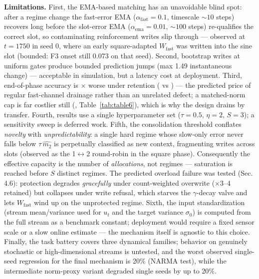 \documentclass[11pt]{article}
\begin{document}
\textbf{Limitations.} First, the EMA-based matching has an unavoidable
blind spot: after a regime change the fast-error EMA
(\(\alpha_{\mathrm{fast}}{=}0.1\), timescale \(\sim 10\) steps) recovers long
before the slot-error EMA (\(\alpha_{\mathrm{ema}}{=}0.01\), \(\sim 100\)
steps) re-qualifies the correct slot, so contaminating reinforcement
writes slip through --- observed at \(t{=}1750\) in seed 0, where an
early square-adapted \(W_{\mathrm{fast}}\) was written into the sine
slot (bounded: F3 onset still 0.073 on that seed). Second, bootstrap
writes at uniform gates produce bounded
prediction jumps (max 1.49 instantaneous change) --- acceptable in
simulation, but a latency cost at deployment. Third, end-of-phase
accuracy is \ctxEndPenalty\(\times\) worse under retention (\ctxEnd{} vs \blockEnd) --- the
predicted price of regular fast-channel drainage rather than an
unrelated defect; a matched-norm cap is far costlier still (\clampEnd,
Table~\ref{tab:table6}), which is why the design drains by transfer. Fourth, results use a single
hyperparameter set (\(\tau{=}0.5\), \(\eta{=}2\), \(S{=}3\)); a sensitivity sweep is
deferred work. Fifth, the consolidation threshold
conflates \emph{novelty} with \emph{unpredictability}: a single hard regime whose
slow-only error never falls below \(\tau\,\widehat{m_2}\) is perpetually
classified as new context, fragmenting writes across slots (observed as
the 1\(\leftrightarrow 2\) round-robin in the square phase). Consequently the effective
capacity is the number of \emph{allocations}, not regimes --- saturation is
reached before \(S\) distinct regimes. The predicted overload failure
was tested (Sec. 4.6): protection degrades \emph{gracefully} under
count-weighted overwrite (×3--4 retained) but collapses under write
refusal, which starves the \(\gamma\)-decay valve and lets
\(W_{\mathrm{fast}}\) wind up on the unprotected regime. Sixth, the input standardization (stream mean/variance used for
\(u_t\) and the target variance \(\sigma_0\)) is computed from the full
stream as a benchmark constant; deployment would require a fixed
sensor scale or a slow online estimate --- the mechanism itself is
agnostic to this choice. Finally, the task battery covers three
dynamical families; behavior on genuinely stochastic or
high-dimensional streams is untested, and the worst observed single-seed
regression for the final mechanism is 20\% (NARMA test), while the
intermediate norm-proxy variant degraded single seeds by up to 20\%.
\end{document}
